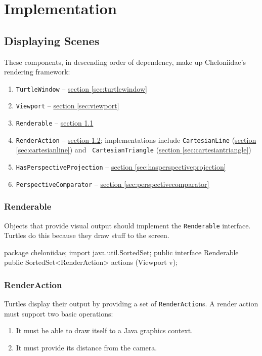 \documentclass{report}
\newcommand{\Ref}[2]{\hyperref[#2]{#1 \ref*{#2}}}
\begin{document}
\part {Implementation} \label{sec:implementation}
\chapter {Displaying Scenes} \label{sec:displaying-scenes}
    These components, in descending order of dependency, make up Cheloniidae's rendering framework:

\begin{enumerate}
\item {\tt TurtleWindow} -- \Ref{section}{sec:turtlewindow}
\item {\tt Viewport} -- \Ref{section}{sec:viewport}
\item {\tt Renderable} -- \Ref{section}{sec:renderable}
\item {\tt RenderAction} -- \Ref{section}{sec:renderaction}; implementations include {\tt CartesianLine} (\Ref{section}{sec:cartesianline}) and {\tt
        CartesianTriangle} (\Ref{section}{sec:cartesiantriangle})
\item {\tt HasPerspectiveProjection} -- \Ref{section}{sec:hasperspectiveprojection}
\item {\tt PerspectiveComparator} -- \Ref{section}{sec:perspectivecomparator}
\end{enumerate}

\section {Renderable} \label{sec:renderable}
      Objects that provide visual output should implement the {\tt Renderable} interface. Turtles do this because they draw stuff to the screen.

\begin{javacode}
package cheloniidae;
import java.util.SortedSet;
public interface Renderable {
  public SortedSet<RenderAction> actions (Viewport v);
}
\end{javacode}

\section {RenderAction} \label{sec:renderaction}
      Turtles display their output by providing a set of {\tt RenderAction}s. A render action must support two basic operations:

\begin{enumerate}
\item It must be able to draw itself to a Java graphics context.
\item It must provide its distance from the camera.
\end{enumerate}
\end{document}
